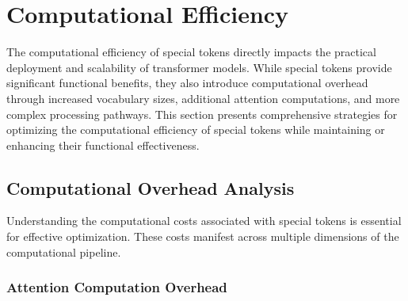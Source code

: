 
\section{Computational Efficiency}

The computational efficiency of special tokens directly impacts the practical deployment and scalability of transformer models. While special tokens provide significant functional benefits, they also introduce computational overhead through increased vocabulary sizes, additional attention computations, and more complex processing pathways. This section presents comprehensive strategies for optimizing the computational efficiency of special tokens while maintaining or enhancing their functional effectiveness.

\subsection{Computational Overhead Analysis}

Understanding the computational costs associated with special tokens is essential for effective optimization. These costs manifest across multiple dimensions of the computational pipeline.
\begin{comment}
Feedback: Before linking to the code, it's crucial to explain the core strategies for efficiency. For example: "Optimizing the efficiency of special tokens typically involves reducing the effective sequence length that the transformer has to process. The main strategies to achieve this are:
1.  **Token Pruning**: Identifying and removing special tokens (or content tokens) that are redundant or have low importance for the downstream task. This is often done in the later layers of the model.
2.  **Token Merging**: Combining the embeddings of several special tokens (or a special token and its neighbors) into a single, more compact representation.
3.  **Efficient Attention Patterns**: Designing custom attention masks that prevent special tokens from attending to all other tokens, replacing the expensive global attention with a cheaper sparse or local attention pattern."
\end{comment}

\subsubsection{Attention Computation Overhead}

